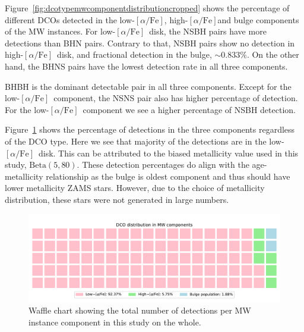 \documentclass[journal, twocolumns]{IEEEtran}
\newcommand{\lowalpha}{low-$[\alpha/\text{Fe}]$}
\newcommand{\highalpha}{high-$[\alpha/\text{Fe}]$}
\newcommand{\ecc}[1]{e_\text{#1}}
\begin{document}
    Figure~\ref{fig:dcotypemwcomponentdistributioncropped} shows the percentage of different DCOs detected in the \lowalpha, \highalpha and bulge components of the MW instances.
    For \lowalpha\ disk, the NSBH pairs have more detections than BHN pairs.
	Contrary to that, NSBH pairs show no detection in \highalpha\ disk, and fractional detection in the bulge, $\sim0.833\%$.
	On the other hand, the BHNS pairs have the lowest detection rate in all three components.
	
	BHBH is the dominant detectable pair in all three components. 
	Except for the \lowalpha\ component, the NSNS pair also has higher percentage of detection. 
	For the \lowalpha\ component we see a higher percentage of NSBH detection.

    Figure~\ref{fig:dcotypemwdistribution} shows the percentage of detections in the three components regardless of the DCO type.
    Here we see that majority of the detections are in the \lowalpha\ disk.
    This can be attributed to the biased metallicity value used in this study, $\text{Beta}(5, 80)$.
    These detection percentages do align with the age-metallicity relationship as the bulge is oldest component and thus should have lower metallicity ZAMS stars.
    However, due to the choice of metallicity distribution, these stars were not generated in large numbers.

	\begin{figure}[!h]%
		\centering
		\includegraphics[width=\columnwidth]{analysis_data/main_analysis_folder/dco_type_MW_distribution}
		\caption{Waffle chart showing the total number of detections per MW instance component in this study on the whole.}
		\label{fig:dcotypemwdistribution}
	\end{figure}%


\end{document}
